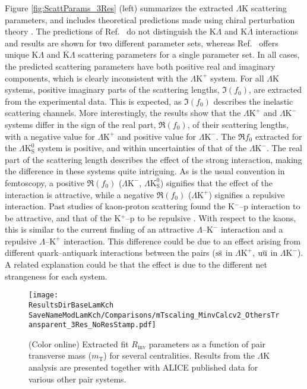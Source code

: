 \documentclass[ALICE,manyauthors]{cernphprep}
\newcommand{\ResultsDirBaseLamKch}{/home/jesse/Analysis/FemtoAnalysis/Results/Results_cLamcKch_20190319/}
\newcommand{\MomRes}{_MomResCrctn}%
\newcommand{\NonFlatBgdLamKch}{_NonFlatBgdCrctnLamK0LamKchPolynomial}
\newcommand{\ResNum}{_3Res}
\newcommand{\PrimMaxDecay}{_PrimMaxDecay10fm}
\newcommand{\ResMethod}{_UsingXiDataAndCoulombOnly}
\newcommand{\ParamFixAndShareLamKch}{_ShareLam_Dualie_ShareLam_ShareRadii}
\newcommand{\SaveNameModLamKch}{\MomRes\NonFlatBgdLamKch\ResNum\PrimMaxDecay\ResMethod\ParamFixAndShareLamKch}
\newcommand{\mt}{$m_{\mathrm{T}}$\xspace}
\newcommand{\Lam}{$\Lambda$\xspace}
\newcommand{\ALam}{$\overline{\Lambda}$\xspace}
\newcommand{\KchP}{$\mathrm{K^{+}}$\xspace}
\newcommand{\KchM}{$\mathrm{K^{-}}$\xspace}
\newcommand{\LamK}{$\Lambda$K\xspace}
\newcommand{\LamKchP}{$\Lambda\mathrm{K^{+}}$\xspace}
\newcommand{\LamKchM}{$\Lambda\mathrm{K^{-}}$\xspace}
\newcommand{\LamKs}{$\Lambda\mathrm{K^{0}_{S}}$\xspace}
\begin{document}
Figure \ref{fig:ScattParams_3Res} (left) summarizes the extracted \LamK scattering parameters, and includes theoretical predictions made using chiral perturbation theory \cite{Liu:2006xja,Mai:2009ce}.
The predictions of Ref.\ \cite{Liu:2006xja} do not distinguish the K\Lam and K\ALam interactions and results are shown for two different parameter sets, whereas Ref.\ \cite{Mai:2009ce} offers unique K\Lam and $\overline{\mathrm{K}}$\Lam scattering parameters for a single parameter set. 
In all cases, the predicted scattering parameters have both positive real and imaginary components, which is clearly inconsistent with the \LamKchP system.
For all \LamK systems, positive imaginary parts of the scattering lengths, $\Im(f_{0})$, are extracted from the experimental data. 
This is expected, as $\Im(f_{0})$ describes the inelastic scattering channels.
More interestingly, the results show that the \LamKchP and \LamKchM systems differ in the sign of the real part, $\Re(f_{0})$, of their scattering lengths, with a negative value for \LamKchP and positive value for \LamKchM.
The $\Re f_{0}$ extracted for the \LamKs system is positive, and within uncertainties of that of the \LamKchM. 
The real part of the scattering length describes the effect of the strong interaction, making the difference in these systems quite intriguing.
As is the usual convention in femtoscopy, a positive $\Re(f_{0})$ (\LamKchM, \LamKs) signifies that the effect of the interaction is attractive, while a negative $\Re(f_{0})$ (\LamKchP) signifies a repulsive interaction.
Past studies of kaon-proton scattering found the K$^{-}$--p interaction to be attractive, and that of the K$^{+}$--p to be repulsive \cite{Humphrey:1962zz, Hadjimichef:2002xe, Ikeda:2012au}.
With respect to the kaons, this is similar to the current finding of an attractive \Lam--\KchM interaction and a repulsive \Lam--\KchP interaction.
This difference could be due to an effect arising from different quark--antiquark interactions between the pairs ($\rm s\overline{s}$ in \LamKchP, $\rm u\overline{u}$ in \LamKchM).
A related explanation could be that the effect is due to the different net strangeness for each system.


\begin{figure}[h]
  \centering
  \texttt{[image: \\ResultsDirBaseLamKch\\SaveNameModLamKch/Comparisons/mTscaling\_MinvCalcv2\_OthersTransparent\_3Res\_NoResStamp.pdf]}
  \caption[\mt Scaling of Radii: 3 Residuals in Fit]
  {
  (Color online) Extracted fit $R_{\mathrm{inv}}$ parameters as a function of pair transverse mass (\mt) for several centralities.
  Results from the \LamK analysis are presented together with ALICE published data \cite{Adam:2015vja} for various other pair systems.  
  }
  \label{fig:mTScalingOfRadii_3Res}
\end{figure}
\end{document}
